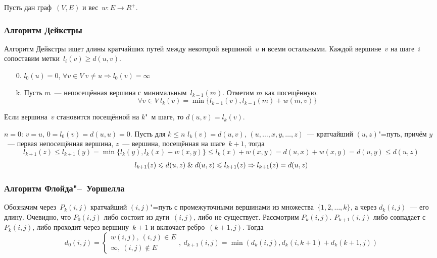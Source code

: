 Пусть дан граф~$(V, E)$ и вес~$w \colon E \to R^+$.

\subsubsection{Алгоритм Дейкстры}
 Алгоритм Дейкстры ищет длины кратчайших путей между некоторой вершиной~$u$ и всеми остальными.
Каждой вершине~$v$ на шаге~$i$ сопоставим метки~$l_i(v) \geqslant d(u, v)$.
\begin{enumerate}
	\item[0.] $l_0(u) = 0$, $\forall v \in V \ v \neq u \Rightarrow l_0(v) = \infty$
	\item[k.] Пусть $m$~--- непосещённая вершина с минимальным~$l_{k-1}(m)$.
	Отметим $m$ как посещённую.
	\begin{equation*}
	\forall v \in V \ l_k(v) = \min \{ l_{k-1}(v), l_{k-1}(m) + w(m, v) \}
	\end{equation*}
\end{enumerate}

\begin{theorem}
Если вершина~$v$ становится посещённой на $k$"~м шаге, то $d(u, v) = l_k(v)$.
\end{theorem}
\begin{proofmathind}
	\indbase $n = 0$: $v = u$, $0 = l_0(v) = d(u, u) = 0$.
	\indstep Пусть для $k \leqslant n$ $l_k(v) = d(u, v)$, $(u, \ldots, x, y, \ldots, z)$~--- кратчайший $(u, z)$"=путь, причём $y$~--- первая непосещённая вершина, $z$~--- вершина, посещённая на шаге~$k + 1$, тогда
	\begin{equation*}
	l_{k+1}(z) \leqslant l_{k+1}(y) = \min \{ l_k(y), l_k(x) + w(x, y) \} \leqslant l_k(x) + w(x, y) = d(u, x) + w(x, y) = d(u, y) \leqslant d(u, z)
	\end{equation*}
	\begin{equation*}
	l_{k+1}(z) \leqslant d(u, z) \mathrel{\&} d(u, z) \leqslant l_{k+1}(z) \Rightarrow l_{k+1}(z) = d(u, z)
	\end{equation*}
	\indend
\end{proofmathind}

\subsubsection{Алгоритм Флойда"--~Уоршелла}
 Обозначим через~$P_k(i, j)$ кратчайший $(i, j)$"=путь с промежуточными вершинами из множества~$\{ 1, 2, \ldots, k \}$, а через $d_k(i, j)$~--- его длину.
Очевидно, что $P_0(i, j)$ либо состоит из дуги~$(i, j)$, либо не существует.
Рассмотрим $P_k(i, j)$.
$P_{k+1}(i, j)$ либо совпадает с $P_k(i, j)$, либо проходит через вершину~$k + 1$ и включает ребро~$(k + 1, j)$.
Тогда
\begin{equation*}
d_0(i, j) =
\begin{cases}
w(i, j), \ (i, j) \in E \\
\infty, \ (i, j) \notin E
\end{cases}, \
d_{k+1}(i, j) = \min(d_k(i, j), d_k(i, k + 1) + d_k(k + 1, j))
\end{equation*}